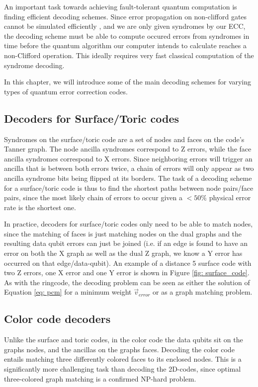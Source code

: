 An important task towards achieving fault-tolerant quantum computation is
finding efficient decoding schemes.
Since error propagation on non-clifford gates cannot be simulated efficiently
\cite{gottesmanFaultTolerant}, and we are only given syndromes by our ECC,
the decoding scheme must be able to compute occured 
errors from syndromes in time before the quantum algorithm our computer intends 
to calculate reaches a non-Clifford operation. This ideally requires very fast 
classical computation of the syndrome decoding.

In this chapter, we will introduce some of the main decoding schemes for
varying types of quantum error correction codes.

\subsection{Decoders for Surface/Toric codes}
Syndromes on the surface/toric code are a set of nodes and
faces on the code's Tanner graph. The node ancilla syndromes correspond to
Z errors, while the face ancilla syndromes correspond to X errors.
Since neighboring errors will trigger an ancilla that is between 
both errors twice, a chain of errors will only appear as two ancilla
syndrome bits being flipped at its borders.
The task of a decoding scheme for a surface/toric code is thus to
find the shortest paths between node pairs/face pairs, since the most likely
chain of errors to occur given a $<50\%$ physical error rate is the 
shortest one.

In practice, decoders for surface/toric codes only need to be able to
match nodes, since the matching of faces is just matching nodes on the 
dual graphs and the resulting data qubit errors can just be joined
(i.e. if an edge is found to have an error on both the X graph as well as the
dual Z graph, we know a Y error has occurred on that edge/data-qubit).
An example of a distance 5 surface code with two Z errors, one X error and
one Y error is shown in Figure \ref{fig: surface_code}.
As with the ringcode, the decoding problem can be seen as either the
solution of Equation \ref{eq: pcm} for a minimum weight $\vec{v}_{error}$
or as a graph matching problem.



\subsection{Color code decoders}
Unlike the surface and toric codes, in the color code the 
data qubits sit on the graphs nodes, and the ancillas on the 
graphs faces. Decoding the color code entails matching 
three differently colored faces to its enclosed nodes.
This is a significantly more challenging task than
decoding the 2D-codes, since optimal three-colored graph matching 
is a confirmed NP-hard problem\cite{delfosse}.

